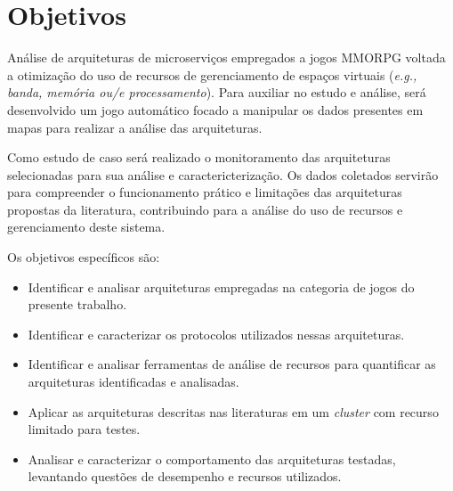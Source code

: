 \section{Objetivos}
\label{obj}

Análise de arquiteturas de microserviços empregados a jogos MMORPG voltada a otimização do uso de recursos de gerenciamento de espaços virtuais (\textit{e.g., banda, memória ou/e processamento}). Para auxiliar no estudo e análise, será desenvolvido um jogo automático focado a manipular os dados presentes em  mapas para realizar a análise das arquiteturas.

Como estudo de caso será realizado o monitoramento das arquiteturas selecionadas para sua análise e caractericterização. Os dados coletados servirão para compreender o funcionamento prático e limitações das arquiteturas propostas da literatura, contribuindo para a análise do uso de recursos e gerenciamento deste sistema.

Os objetivos específicos são:
\begin{itemize}
    \item Identificar e analisar arquiteturas empregadas na categoria de jogos do presente trabalho.
    \item Identificar e caracterizar os protocolos utilizados nessas arquiteturas.
    \item Identificar e analisar ferramentas de análise de recursos para quantificar as arquiteturas identificadas e analisadas.
    \item Aplicar as arquiteturas descritas nas literaturas em um \textit{cluster} com recurso limitado para testes.
    \item Analisar e caracterizar o comportamento das arquiteturas testadas, levantando questões de desempenho e recursos utilizados.
\end{itemize}
